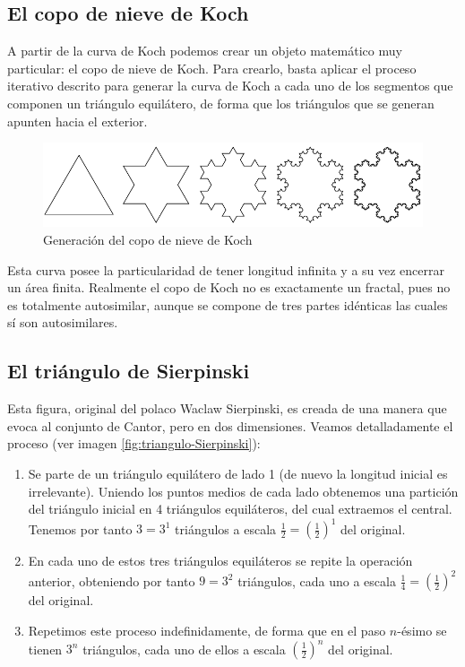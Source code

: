 \subsection{El copo de nieve de Koch}
\label{subsection:copo-Koch}

A partir de la curva de Koch podemos crear un objeto matemático muy particular: el copo de nieve de Koch. Para crearlo, basta aplicar el proceso iterativo descrito para generar la curva de Koch a cada uno de los segmentos que componen un triángulo equilátero, de forma que los triángulos que se generan apunten hacia el exterior.


\begin{figure} [h]
\centering
\includegraphics[scale = 0.6]{img/copo-Koch.png}
\caption{Generación del copo de nieve de Koch}
 \label{fig:copo-Koch}
\end{figure}

Esta curva posee la particularidad de tener longitud infinita y a su vez encerrar un área finita. Realmente el copo de Koch no es exactamente un fractal, pues no es totalmente autosimilar, aunque se compone de tres partes idénticas las cuales sí son autosimilares.

\subsection{El triángulo de Sierpinski}
\label{subsection:triangulo-Sierpinski}

Esta figura, original del polaco Waclaw Sierpinski, es creada de una manera que evoca al conjunto de Cantor, pero en dos dimensiones. Veamos detalladamente el proceso (ver imagen \ref{fig:triangulo-Sierpinski}):

\begin{enumerate}
\item Se parte de un triángulo equilátero de lado 1 (de nuevo la longitud inicial es irrelevante). Uniendo los puntos medios de cada lado obtenemos una partición del triángulo inicial en 4 triángulos equiláteros, del cual extraemos el central. Tenemos por tanto $3=3^1$ triángulos a escala $\frac 1 2 = \left(\frac 1 2\right)^1$ del original.

\item En cada uno de estos tres triángulos equiláteros se repite la operación anterior, obteniendo por tanto $9=3^2$ triángulos, cada uno a escala $\frac 1 4 = \left(\frac 1 2\right)^2$ del original.

\item Repetimos este proceso indefinidamente, de forma que en el paso $n$-ésimo se tienen $3^n$ triángulos, cada uno de ellos a escala $\left(\frac 1 2\right)^n$ del original.
\end{enumerate}

